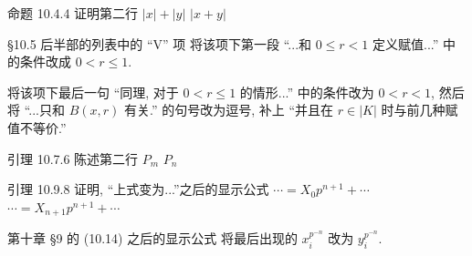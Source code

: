 \documentclass{AJerrata}
\begin{document}
\begin{Errata}
		\item[命题 10.4.4 证明第二行]
		\Orig $|x|+|y|$
		\Corr $|x+y|$
		
		\item[\S 10.5 后半部的列表中的 ``V'' 项]
		将该项下第一段 ``...和 $0 \leq r < 1$ 定义赋值...'' 中的条件改成 $0 < r \leq 1$.
		
		将该项下最后一句 ``同理, 对于 $0 < r \leq 1$ 的情形...'' 中的条件改为 $0 < r < 1$, 然后将 ``...只和 $B(x, r)$ 有关.'' 的句号改为逗号, 补上 ``并且在 $r \in |K|$ 时与前几种赋值不等价.''
		
		\item[引理 10.7.6 陈述第二行]
		\Orig $P_m$
		\Corr $P_n$
		
		\item[引理 10.9.8 证明, ``上式变为...''之后的显示公式]
		\Orig $\cdots = X_0 p^{n+1} + \cdots$
		\Corr $\cdots = X_{n+1} p^{n+1} + \cdots$
		
		\item[第十章 \S 9 的 (10.14) 之后的显示公式]
		将最后出现的 $x_i^{p^{-n}}$ 改为 $y_i^{p^{-n}}$.
	\end{Errata}
\end{document}

